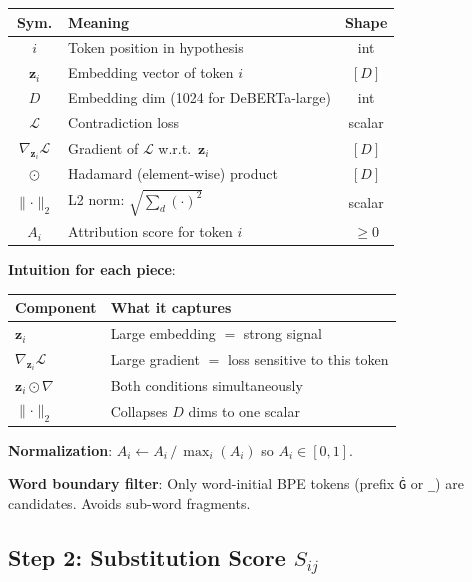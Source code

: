 \documentclass[10pt,a4paper,twocolumn]{article}
\begin{document}
\begin{small}
\begin{tabular}{@{}cp{}c@{}}
\toprule
\textbf{Sym.} & \textbf{Meaning} & \textbf{Shape} \\
\midrule
$i$ & Token position in hypothesis & int \\
$\bm{z}_i$ & Embedding vector of token $i$ & $[D]$ \\
$D$ & Embedding dim (1024 for DeBERTa-large) & int \\
$\mathcal{L}$ & Contradiction loss & scalar \\
$\nabla_{\!\bm{z}_i}\mathcal{L}$ & Gradient of $\mathcal{L}$ w.r.t.\ $\bm{z}_i$ & $[D]$ \\
$\odot$ & Hadamard (element-wise) product & $[D]$ \\
$\lVert\cdot\rVert_2$ & L2 norm: $\sqrt{\sum_d (\cdot)^2}$ & scalar \\
$A_i$ & Attribution score for token $i$ & $\ge 0$ \\
\bottomrule
\end{tabular}
\end{small}

\textbf{Intuition for each piece}:

\begin{small}
\begin{tabular}{@{}lp{}@{}}
\toprule
\textbf{Component} & \textbf{What it captures} \\
\midrule
$\bm{z}_i$ & Large embedding $=$ strong signal \\
$\nabla_{\!\bm{z}_i}\mathcal{L}$ & Large gradient $=$ loss sensitive to this token \\
$\bm{z}_i \odot \nabla$ & Both conditions simultaneously \\
$\lVert\cdot\rVert_2$ & Collapses $D$ dims to one scalar \\
\bottomrule
\end{tabular}
\end{small}

\textbf{Normalization}: $A_i \leftarrow A_i \,/\, \max_i(A_i)$ so $A_i \in [0,1]$.

\textbf{Word boundary filter}: Only word-initial BPE tokens (prefix \texttt{\.G} or \texttt{\_}) are candidates. Avoids sub-word fragments.

\subsection{Step 2: Substitution Score $S_{ij}$}
\end{document}
